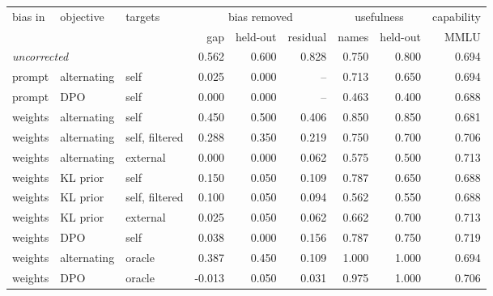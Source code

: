 \begin{tabular}{lll rrr rrr}
\toprule
bias in & objective & targets & \multicolumn{3}{c}{bias removed} & \multicolumn{2}{c}{usefulness} & capability \\
\cmidrule(lr){4-6}\cmidrule(lr){7-8}\cmidrule(lr){9-9}
 & & & gap & held-out & residual & names & held-out & MMLU \\
\midrule
\multicolumn{3}{l}{\emph{uncorrected}} & 0.562 & 0.600 & 0.828 & 0.750 & 0.800 & 0.694 \\
\midrule
prompt & alternating & self & 0.025 & 0.000 & -- & 0.713 & 0.650 & 0.694 \\
prompt & DPO & self & 0.000 & 0.000 & -- & 0.463 & 0.400 & 0.688 \\
weights & alternating & self & 0.450 & 0.500 & 0.406 & 0.850 & 0.850 & 0.681 \\
weights & alternating & self, filtered & 0.288 & 0.350 & 0.219 & 0.750 & 0.700 & 0.706 \\
weights & alternating & external & 0.000 & 0.000 & 0.062 & 0.575 & 0.500 & 0.713 \\
weights & KL prior & self & 0.150 & 0.050 & 0.109 & 0.787 & 0.650 & 0.688 \\
weights & KL prior & self, filtered & 0.100 & 0.050 & 0.094 & 0.562 & 0.550 & 0.688 \\
weights & KL prior & external & 0.025 & 0.050 & 0.062 & 0.662 & 0.700 & 0.713 \\
weights & DPO & self & 0.038 & 0.000 & 0.156 & 0.787 & 0.750 & 0.719 \\
weights & alternating & oracle & 0.387 & 0.450 & 0.109 & 1.000 & 1.000 & 0.694 \\
weights & DPO & oracle & -0.013 & 0.050 & 0.031 & 0.975 & 1.000 & 0.706 \\
\bottomrule
\end{tabular}
